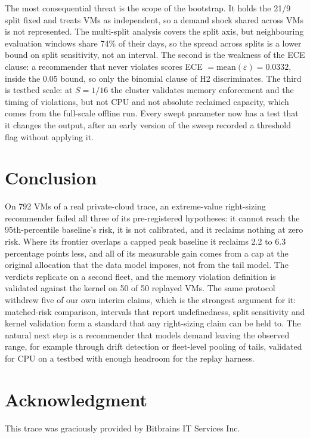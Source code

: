 \documentclass[conference]{IEEEtran}
\begin{document}
The most consequential threat is the scope of the bootstrap. It holds the 21/9 split fixed and treats VMs as independent, so a demand shock shared across VMs is not represented. The multi-split analysis covers the split axis, but neighbouring evaluation windows share 74\% of their days, so the spread across splits is a lower bound on split sensitivity, not an interval. The second is the weakness of the ECE clause: a recommender that never violates scores ECE $=\text{mean}(\varepsilon)=0.0332$, inside the 0.05 bound, so only the binomial clause of H2 discriminates. The third is testbed scale: at $S=1/16$ the cluster validates memory enforcement and the timing of violations, but not CPU and not absolute reclaimed capacity, which comes from the full-scale offline run. Every swept parameter now has a test that it changes the output, after an early version of the sweep recorded a threshold flag without applying it.

\section{Conclusion}
On 792 VMs of a real private-cloud trace, an extreme-value right-sizing recommender failed all three of its pre-registered hypotheses: it cannot reach the 95th-percentile baseline's risk, it is not calibrated, and it reclaims nothing at zero risk. Where its frontier overlaps a capped peak baseline it reclaims 2.2 to 6.3 percentage points less, and all of its measurable gain comes from a cap at the original allocation that the data model imposes, not from the tail model. The verdicts replicate on a second fleet, and the memory violation definition is validated against the kernel on 50 of 50 replayed VMs. The same protocol withdrew five of our own interim claims, which is the strongest argument for it: matched-risk comparison, intervals that report undefinedness, split sensitivity and kernel validation form a standard that any right-sizing claim can be held to. The natural next step is a recommender that models demand leaving the observed range, for example through drift detection or fleet-level pooling of tails, validated for CPU on a testbed with enough headroom for the replay harness.

\section*{Acknowledgment}
This trace was graciously provided by Bitbrains IT Services Inc.
\end{document}
